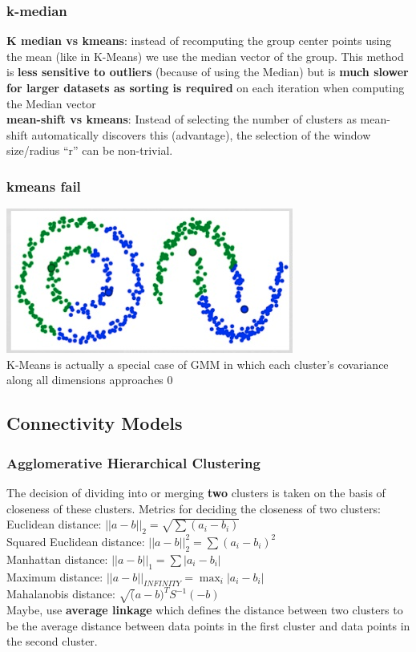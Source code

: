 \documentclass{beamer}
\begin{document}
\begin{frame}\frametitle{k-median}
\textbf{K median vs kmeans}: instead of recomputing the group center points using the mean (like in K-Means) we use the median vector of the group. This method is \textbf{less sensitive to outliers} (because of using the Median) but is \textbf{much slower for larger datasets as sorting is required} on each iteration when computing the Median vector\\
\textbf{mean-shift vs kmeans}: Instead of selecting the number of clusters as mean-shift automatically discovers this (advantage), the selection of the window size/radius “r” can be non-trivial.

\end{frame}


\begin{frame}\frametitle{kmeans fail}
	\includegraphics[scale=0.5]{kmeans_fail}\\
	K-Means is actually a special case of GMM in which each cluster’s covariance along all dimensions approaches 0
\end{frame}



\subsection{Connectivity Models}
\begin{frame}\frametitle{Agglomerative Hierarchical Clustering}
The decision of dividing into or merging \textbf{two} clusters is taken on the basis of closeness of these clusters. Metrics for deciding the closeness of two clusters:\\
Euclidean distance: $||a-b||_2=\sqrt{\sum(a_i-b_i)}$\\
Squared Euclidean distance: $||a-b||_2^2=\sum(a_i-b_i)^2$\\
Manhattan distance: $||a-b||_1=\sum|a_i-b_i|$\\
Maximum distance: $||a-b||_{INFINITY} =\max_i|a_i-b_i|$\\
Mahalanobis distance: $\sqrt(a-b)^T S^{-1} (-b)$\\
Maybe, use \textbf{average linkage} which defines the distance between two clusters to be the average distance between data points in the first cluster and data points in the second cluster.

\end{frame}
\end{document}
